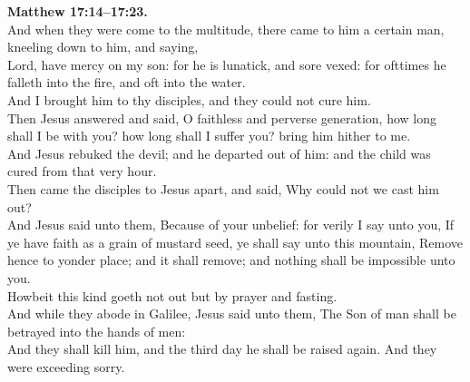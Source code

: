 \documentclass[10pt]{article} %
\begin{document}
{\begin{minipage}[t]{0.45\textwidth}
\textbf{Matthew 17:14--17:23.}\\
And when they were come to the multitude, there came to him a certain man, kneeling down to him, and saying,\\
Lord, have mercy on my son: for he is lunatick, and sore vexed: for ofttimes he falleth into the fire, and oft into the water.\\
And I brought him to thy disciples, and they could not cure him.\\
Then Jesus answered and said, O faithless and perverse generation, how long shall I be with you? how long shall I suffer you? bring him hither to me.\\
And Jesus rebuked the devil; and he departed out of him: and the child was cured from that very hour.\\
Then came the disciples to Jesus apart, and said, Why could not we cast him out?\\
And Jesus said unto them, Because of your unbelief: for verily I say unto you, If ye have faith as a grain of mustard seed, ye shall say unto this mountain, Remove hence to yonder place; and it shall remove; and nothing shall be impossible unto you.\\
Howbeit this kind goeth not out but by prayer and fasting.\\
And while they abode in Galilee, Jesus said unto them, The Son of man shall be betrayed into the hands of men:\\
And they shall kill him, and the third day he shall be raised again. And they were exceeding sorry.\\

\end{minipage}}
\vspace*{\fill}
\newpage
\Huge%
\vspace*{\fill}
\end{document}
